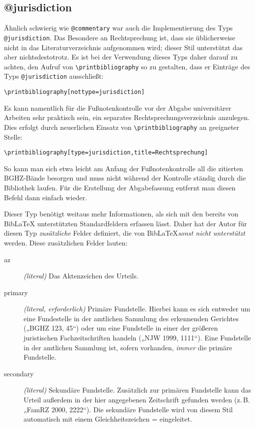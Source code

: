 \documentclass[11pt,a4paper,DIV=calc]{scrartcl}
\newcommand\software[1]{\textsf{#1}}
\newcommand\Biblatex{\software{Bib\LaTeX{}}\xspace}
\newcommand\zB{z.\,B.\xspace}
\begin{document}
\subsection{@jurisdiction}

Ähnlich schwierig wie \verb+@commentary+ war auch die Implementierung
des Typs \verb+@jurisdiction+. Das Besondere an Rechtsprechung ist, dass
sie üblicherweise nicht in das Literaturverzeichnis aufgenommen wird;
dieser Stil unterstützt das aber nichtsdestotrotz. Es ist bei der
Verwendung dieses Typs daher darauf zu achten, den Aufruf von
\verb+\printbibliography+ so zu gestalten, dass er Einträge des Typs
\verb+@jurisdiction+ ausschließt:

\begin{verbatim}
\printbibliography[nottype=jurisdiction]
\end{verbatim}

Es kann namentlich für die Fußnotenkontrolle vor der Abgabe
universitärer Arbeiten sehr praktisch sein, ein separates
Rechtsprechungsverzeichnis anzulegen. Dies erfolgt durch neuerlichen
Einsatz von \verb+\printbibliography+ an geeigneter Stelle:

\begin{verbatim}
\printbibliography[type=jurisdiction,title=Rechtsprechung]
\end{verbatim}

So kann man sich etwa leicht am Anfang der Fußnotenkontrolle all die
zitierten BGHZ-Bände besorgen und muss nicht während der Kontrolle
ständig durch die Bibliothek laufen. Für die Erstellung der
Abgabefassung entfernt man diesen Befehl dann einfach wieder.

Dieser Typ benötigt weitaus mehr Informationen, als sich mit den
bereits von \Biblatex unterstützten Standardfeldern erfassen
lässt. Daher hat der Autor für diesen Typ \emph{zusätzliche} Felder
definiert, die von \Biblatex \emph{sonst nicht unterstützt}
werden. Diese zusätzlichen Felder lauten:

\begin{description}
\item[az] \emph{(literal)} Das Aktenzeichen des Urteils.
\item[primary] \emph{(literal, erforderlich)} Primäre
  Fundstelle. Hierbei kann es sich entweder um eine Fundestelle in der
  amtlichen Sammlung des erkennenden Gerichtes („BGHZ 123, 45“) oder
  um eine Fundstelle in einer der größeren juristischen
  Fachzeitschriften handeln („NJW 1999, 1111“). Eine Fundstelle in der
  amtlichen Sammlung ist, sofern vorhanden, \emph{immer} die primäre
  Fundstelle.
\item[secondary] \emph{(literal)} Sekundäre Fundstelle. Zusätzlich zur
  primären Fundstelle kann das Urteil außerdem in der hier angegebenen
  Zeitschrift gefunden werden (\zB „FamRZ 2000, 2222“). Die sekundäre
  Fundstelle wird von diesem Stil automatisch mit einem
  Gleichheitszeichen = eingeleitet.
\end{description}
\end{document}
